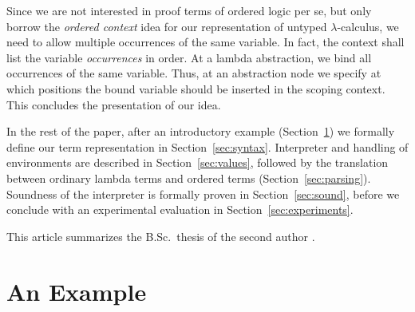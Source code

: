 \documentclass[submission,copyright,creativecommons]{eptcs}
\begin{document}
Since we are not interested in proof terms of ordered logic per se,
but only borrow the \emph{ordered context} idea for our
representation of untyped $\lambda$-calculus, 
we need to allow multiple occurrences of the same
variable.  In fact, the context shall list the variable
\emph{occurrences} in order.  At a lambda abstraction, we bind all
occurrences of the same variable.  Thus, at an abstraction node we
specify at which positions the bound variable should be inserted in
the scoping context.  This concludes the presentation of our idea.  

In the rest of the paper, after an introductory example
(Section~\ref{sec:example}) we formally define our term representation
in Section~\ref{sec:syntax}.   Interpreter and handling of
environments are described in Section~\ref{sec:values}, followed by
the translation between ordinary lambda terms and ordered terms
(Section~\ref{sec:parsing}).  Soundness of the interpreter is formally
proven in Section~\ref{sec:sound}, before we conclude with an
experimental evaluation in Section~\ref{sec:experiments}.

This article summarizes the B.Sc.\ thesis of the second author
\cite{kraus:bachelor}.

\section{An Example}
\label{sec:example}



\end{document}
